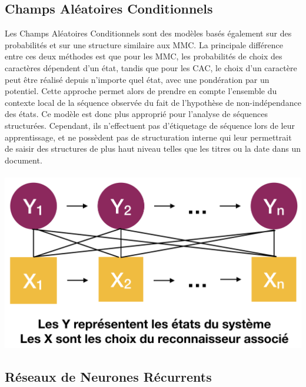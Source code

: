\subsection{Champs Aléatoires Conditionnels}

Les Champs Aléatoires Conditionnels sont des modèles basés également sur des probabilités et
sur une structure similaire aux MMC. La principale différence entre ces deux méthodes est que pour les MMC,
les probabilités de choix des caractères dépendent d'un état, tandis que pour les CAC, le choix d'un
caractère peut être réalisé depuis n'importe quel état, avec une pondération par un potentiel.
Cette approche permet alors de prendre en compte l'ensemble du contexte local de la séquence observée
du fait de l'hypothèse de non-indépendance des états. Ce modèle est donc plus approprié pour l'analyse de
séquences structurées. Cependant, ils n'effectuent pas d'étiquetage de séquence lors de leur apprentissage,
et ne possèdent pas de structuration interne qui leur permettrait de saisir des structures de plus haut
niveau telles que les titres ou la date dans un document.

\paragraph{}
\begin{mdframed}[frametitle={Figure 9 : Schéma de transition et d'observation d'un CAC}, innerbottommargin=10]
\begin{center}
\includegraphics[width=0.6\linewidth]{cac.png}
\end{center}
\end{mdframed}

\subsection{Réseaux de Neurones Récurrents}

